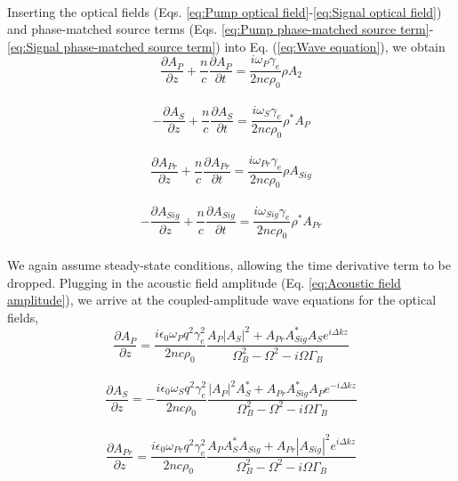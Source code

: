 \documentclass[%
  reprint,
  superscriptaddress,
  amsmath,amssymb,
  aps,
  prapplied,
]{revtex4-2}
\begin{document}
\\
Inserting the optical fields (Eqs. \ref{eq:Pump optical field}-\ref{eq:Signal optical field}) and phase-matched source terms (Eqs. \ref{eq:Pump phase-matched source term}-\ref{eq:Signal phase-matched source term}) into Eq. (\ref{eq:Wave equation}), we obtain
\\
\begin{equation}
    \frac{\partial A_{P}}{\partial z} + \frac{n}{c}\frac{\partial A_{P}}{\partial t} = \frac{i\omega_{P}\gamma_{e}}{2nc\rho_{0}}\rho A_{2}
\end{equation}
\\
\begin{equation}
    -\frac{\partial A_{S}}{\partial z} + \frac{n}{c}\frac{\partial A_{S}}{\partial t} = \frac{i\omega_{S}\gamma_{e}}{2nc\rho_{0}}\rho^{*}A_{P}
\end{equation}
\\
\begin{equation}
    \frac{\partial A_{Pr}}{\partial z} + \frac{n}{c}\frac{\partial A_{Pr}}{\partial t} = \frac{i\omega_{Pr}\gamma_{e}}{2nc\rho_{0}}\rho A_{Sig}
\end{equation}
\\
\begin{equation}
    -\frac{\partial A_{Sig}}{\partial z} + \frac{n}{c}\frac{\partial A_{Sig}}{\partial t} = \frac{i\omega_{Sig}\gamma_{e}}{2nc\rho_{0}}\rho^{*}A_{Pr}
\end{equation}
\\
We again assume steady-state conditions, allowing the time derivative term to be dropped. Plugging in the acoustic field amplitude (Eq. \ref{eq:Acoustic field amplitude}), we arrive at the coupled-amplitude wave equations for the optical fields,
\\
\begin{equation}
    \frac{\partial A_{P}}{\partial z} = \frac{i\epsilon_{0}\omega_{P} q^{2}\gamma_{e}^{2}}{2nc\rho_{0}}\frac{A_{P}|A_{S}|^{2} + A_{Pr}A_{Sig}^{*}A_{S}e^{i\Delta kz}}{\Omega_{B}^{2} - \Omega^{2} - i\Omega\Gamma_{B}}
\end{equation}
\\
\begin{equation}
    \frac{\partial A_{S}}{\partial z} = -\frac{i\epsilon_{0}\omega_{S} q^{2}\gamma_{e}^{2}}{2nc\rho_{0}}\frac{|A_{P}|^{2}A_{S}^{*} + A_{Pr}A_{Sig}^{*}A_{P}e^{-i\Delta kz}}{\Omega_{B}^{2} - \Omega^{2} - i\Omega\Gamma_{B}}
\end{equation}
\\
\begin{equation}
    \frac{\partial A_{Pr}}{\partial z} = \frac{i\epsilon_{0}\omega_{Pr} q^{2}\gamma_{e}^{2}}{2nc\rho_{0}}\frac{A_{P}A_{S}^{*}A_{Sig} + A_{Pr}|A_{Sig}|^{2}e^{i\Delta kz}}{\Omega_{B}^{2} - \Omega^{2} - i\Omega\Gamma_{B}}
\end{equation}
\end{document}

